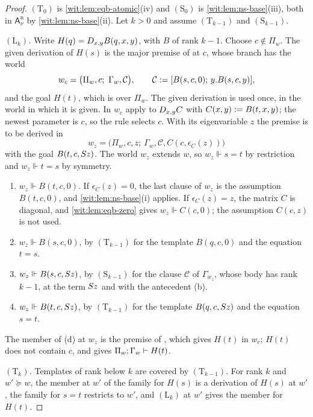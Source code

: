 \begin{proof}
$(\mathrm T_0)$ is \cref{wit:lem:eqb-atomic}(iv) and $(\mathrm S_0)$ is
\cref{wit:lem:ns-base}(iii), both in $\mathsf{A}^{\mathrm n}_{\nu}$ by
\cref{wit:lem:ns-base}(ii).  Let $k>0$ and assume $(\mathrm T_{k-1})$ and
$(\mathrm S_{k-1})$.

\emph{$(\mathrm L_k)$.}  Write $H(q)=D_{x,y}B(q,x,y)$, with $B$ of rank
$k-1$.  Choose $c\notin\Pi_w$.  The given derivation of $H(s)$ is the major
premise of  at $c$, whose branch has the world
\[
 w_c=\bigl(\Pi_w,c;\ \Gamma_w,\mathcal C\bigr),\qquad
 \mathcal C\mathrel{:=}[B(s,c,0);\,y.B(s,c,y)],
\]
and the goal $H(t)$, which is over $\Pi_w$.  The given derivation is used
once, in the world in which it is given.  In $w_c$ apply  to
$D_{x,y}C$ with $C(x,y)\mathrel{:=} B(t,x,y)$; the newest parameter is $c$, so the
rule selects $c$.  With its eigenvariable $z$ the premise is to be derived in
\[
 w_z=\bigl(\Pi_w,c,z;\ \Gamma_w,\mathcal C,C(c,\epsilon_C(z))\bigr)
\]
with the goal $B(t,c,S z)$.  The world $w_z$ extends $w$, so $w_z\Vdash s=t$
by restriction and $w_z\Vdash t=s$ by symmetry.
\begin{enumerate}[label=\textup{(\alph*)}]
\item $w_z\Vdash B(t,c,0)$.  If $\epsilon_C(z)=0$, the last clause of $w_z$
 is the assumption $B(t,c,0)$, and \cref{wit:lem:ns-base}(i) applies.  If
 $\epsilon_C(z)=z$, the matrix $C$ is diagonal, and \cref{wit:lem:eqb-zero}
 gives $w_z\Vdash C(c,0)$; the assumption $C(c,z)$ is not used.
\item $w_z\Vdash B(s,c,0)$, by $(\mathrm T_{k-1})$ for the template
 $B(q,c,0)$ and the equation $t=s$.
\item $w_z\Vdash B(s,c,S z)$, by $(\mathrm S_{k-1})$ for the clause
 $\mathcal C$ of $\Gamma_{w_z}$, whose body has rank $k-1$, at the term
 $S z$ and with the antecedent (b).
\item $w_z\Vdash B(t,c,S z)$, by $(\mathrm T_{k-1})$ for the template
 $B(q,c,S z)$ and the equation $s=t$.
\end{enumerate}
The member of (d) at $w_z$ is the premise of , which gives
$H(t)$ in $w_c$; $H(t)$ does not contain $c$, and  gives
$\Pi_w;\Gamma_w\vdash H(t)$.

\emph{$(\mathrm T_k)$.}  Templates of rank below $k$ are covered by
$(\mathrm T_{k-1})$.  For rank $k$ and $w'\succeq w$, the member at $w'$ of
the family for $H(s)$ is a derivation of $H(s)$ at $w'$, the family for
$s=t$ restricts to $w'$, and $(\mathrm L_k)$ at $w'$ gives the member for
$H(t)$.


\end{proof}
